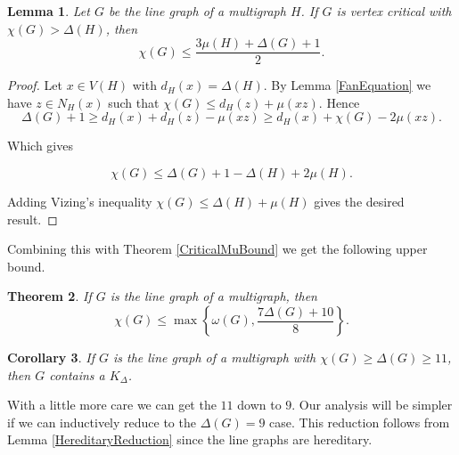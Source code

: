 \documentclass[12pt]{article}
\theoremstyle{plain}
\newtheorem{thm}{Theorem}[section]
\newtheorem{lem}[thm]{Lemma}
\newtheorem{cor}[thm]{Corollary}
\theoremstyle{definition}
\theoremstyle{remark}
\begin{document}
\begin{lem}\label{Goldberg}
Let $G$ be the line graph of a multigraph $H$.  If $G$ is vertex critical with $\chi(G) > \Delta(H)$, then
\[\chi(G) \leq \frac{3\mu(H) + \Delta(G) + 1}{2}.\]
\end{lem}
\begin{proof}
Let $x \in V(H)$ with $d_H(x) = \Delta(H)$.  By Lemma \ref{FanEquation} we have $z \in N_H(x)$ such that $\chi(G) \leq d_H(z) + \mu(xz)$.  Hence
\[\Delta(G) + 1 \geq d_H(x) + d_H(z) - \mu(xz) \geq d_H(x) + \chi(G) - 2\mu(xz).\]

Which gives

\[\chi(G) \leq \Delta(G) + 1 - \Delta(H) + 2\mu(H).\]

Adding Vizing's inequality $\chi(G) \leq \Delta(H) + \mu(H)$ gives the desired result.
\end{proof}

Combining this with Theorem \ref{CriticalMuBound} we get the following upper bound.

\begin{thm}\label{LineGraphGeneralBound}
If $G$ is the line graph of a multigraph, then
\[\chi(G) \leq \max\left\{\omega(G), \frac{7\Delta(G) + 10}{8}\right\}.\]
\end{thm}

\begin{cor}
If $G$ is the line graph of a multigraph with $\chi(G) \geq \Delta(G) \geq 11$, then $G$ contains a $K_{\Delta}$.
\end{cor}

With a little more care we can get the $11$ down to $9$.  Our analysis will be simpler if we can inductively reduce to the $\Delta(G) = 9$ case.  This reduction follows from Lemma \ref{HereditaryReduction} since the line graphs are hereditary.
\end{document}
